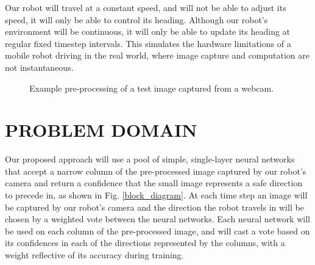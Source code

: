 \documentclass[letterpaper, 10 pt, conference]{ieeeconf}
\begin{document}
		Our robot will travel at a constant speed, and will not be able to adjust its speed, it will only be able to control its heading.  Although our robot's environment will be continuous, it will only be able to update its heading at regular fixed timestep intervals.  This simulates the hardware limitations of a mobile robot driving in the real world, where image capture and computation are not instantaneous.

	\begin{figure}
		\caption{Example pre-processing of a test image captured from a webcam.}
	\end{figure}


	\section*{PROBLEM DOMAIN}

		Our proposed approach will use a pool of simple, single-layer neural networks that accept a narrow column of the pre-processed image captured by our robot's camera and return a confidence that the small image represents a safe direction to precede in, as shown in Fig. \ref{block_diagram}.  At each time step an image will be captured by our robot's camera and the direction the robot travels in will be chosen by a weighted vote between the neural networks.  Each neural network will be used on each column of the pre-processed image, and will cast a vote based on its confidences in each of the directions represented by the columns, with a weight reflective of its accuracy during training.
\end{document}
